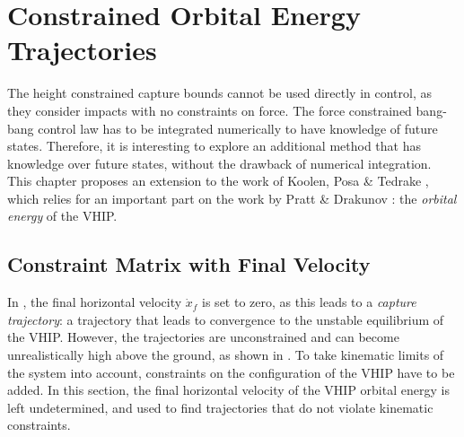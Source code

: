 %
\chapter{Constrained Orbital Energy Trajectories}\label{chap:mpc}
The height constrained capture bounds cannot be used directly in control, as they consider impacts with no constraints on force. The force constrained bang-bang control law has to be integrated numerically to have knowledge of future states. Therefore, it is interesting to explore an additional method that has knowledge over future states, without the drawback of numerical integration. This chapter proposes an extension to the work of Koolen, Posa \& Tedrake \cite{koolen2016balance}, which relies for an important part on the work by Pratt \& Drakunov \cite{pratt2007derivation}: the \textit{orbital energy} of the \ac{VHIP}.

\section{Constraint Matrix with Final Velocity}
In \cite{koolen2016balance}, the final horizontal velocity $\dot{x}_f$ is set to zero, as this leads to a \textit{capture trajectory}: a trajectory that leads to convergence to the unstable equilibrium of the \ac{VHIP}. However, the trajectories are unconstrained and can become unrealistically high above the ground, as shown in . To take kinematic limits of the system into account, constraints on the configuration of the \ac{VHIP} have to be added. In this section, the final horizontal velocity of the \ac{VHIP} orbital energy is left undetermined, and used to find trajectories that do not violate kinematic constraints.

